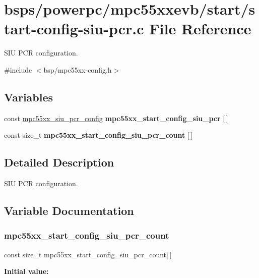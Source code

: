 \hypertarget{start-config-siu-pcr_8c}{}\section{bsps/powerpc/mpc55xxevb/start/start-\/config-\/siu-\/pcr.c File Reference}
\label{start-config-siu-pcr_8c}


S\+IU P\+CR configuration.  


{\ttfamily \#include $<$bsp/mpc55xx-\/config.\+h$>$}\newline
\subsection*{Variables}
\begin{DoxyCompactItemize}
\item 
\mbox{\label{start-config-siu-pcr_8c_a7def1ff57d0c7605598744d0ff6a7bd6}} 
const \mbox{\hyperlink{structmpc55xx__siu__pcr__config}{mpc55xx\+\_\+siu\+\_\+pcr\+\_\+config}} {\bfseries mpc55xx\+\_\+start\+\_\+config\+\_\+siu\+\_\+pcr} \mbox{[}$\,$\mbox{]}
\item 
const size\+\_\+t {\bfseries mpc55xx\+\_\+start\+\_\+config\+\_\+siu\+\_\+pcr\+\_\+count} \mbox{[}$\,$\mbox{]}
\end{DoxyCompactItemize}


\subsection{Detailed Description}
S\+IU P\+CR configuration. 



\subsection{Variable Documentation}
\mbox{\label{start-config-siu-pcr_8c_ab8e419d42cfed9c45c925df327934bb0}} 
\subsubsection{\texorpdfstring{mpc55xx\_start\_config\_siu\_pcr\_count}{mpc55xx\_start\_config\_siu\_pcr\_count}}
{\footnotesize\ttfamily const size\+\_\+t mpc55xx\+\_\+start\+\_\+config\+\_\+siu\+\_\+pcr\+\_\+count\mbox{[}$\,$\mbox{]}}

{\bfseries Initial value\+:}
\begin{DoxyCode}{0}
\DoxyCodeLine{= \{}
\DoxyCodeLine{}
\DoxyCodeLine{\}}

\end{DoxyCode}
